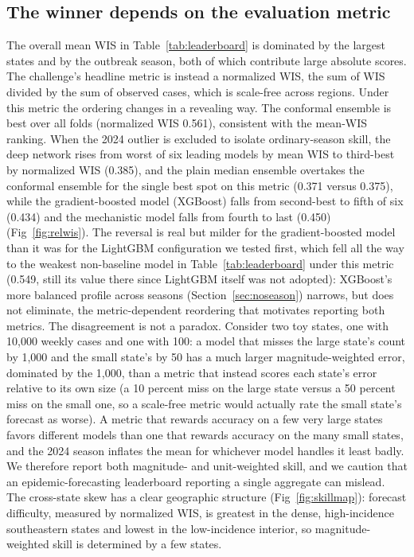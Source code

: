 \documentclass[11pt]{article}
\begin{document}
\subsection{The winner depends on the evaluation metric}\label{sec:metric}
The overall mean WIS in Table~\ref{tab:leaderboard} is dominated by the largest states and by the
outbreak season, both of which contribute large absolute scores. The challenge's headline metric is
instead a normalized WIS, the sum of WIS divided by the sum of observed cases, which is scale-free
across regions. Under this metric the ordering changes in a revealing way. The conformal ensemble is
best over all folds (normalized WIS 0.561), consistent with the mean-WIS ranking. When the 2024
outlier is excluded to isolate ordinary-season skill, the deep network rises from worst of six
leading models by mean WIS to third-best by normalized WIS (0.385), and the plain median ensemble
overtakes the conformal ensemble for the single best spot on this metric (0.371 versus 0.375),
while the gradient-boosted model (XGBoost) falls from second-best to fifth of six (0.434) and the
mechanistic model falls from fourth to last (0.450) (Fig~\ref{fig:relwis}). The reversal is real but
milder for the gradient-boosted model than it was for the LightGBM configuration we tested first,
which fell all the way to the weakest non-baseline model in Table~\ref{tab:leaderboard} under this
metric (0.549, still its value there since LightGBM itself was not adopted): XGBoost's more
balanced profile across seasons (Section~\ref{sec:noseason}) narrows, but does not eliminate, the
metric-dependent reordering that motivates reporting both metrics. The
disagreement is not a paradox. Consider two toy states, one with 10{,}000 weekly cases and one
with 100: a model that misses the large state's count by 1{,}000 and the small state's by 50 has a
much larger magnitude-weighted error, dominated by the 1{,}000, than a metric that instead scores
each state's error relative to its own size (a 10 percent miss on the large state versus a 50
percent miss on the small one, so a scale-free metric would actually rate the small state's
forecast as worse). A metric that rewards accuracy on a few very large states favors
different models than one that rewards accuracy on the many small states, and the 2024 season
inflates the mean for whichever model handles it least badly. We therefore report both magnitude-
and unit-weighted skill, and we caution that an epidemic-forecasting leaderboard reporting a single
aggregate can mislead. The cross-state skew has a clear geographic structure (Fig~\ref{fig:skillmap}):
forecast difficulty, measured by normalized WIS, is greatest in the dense, high-incidence southeastern
states and lowest in the low-incidence interior, so magnitude-weighted skill is determined by a few
states.
\end{document}
